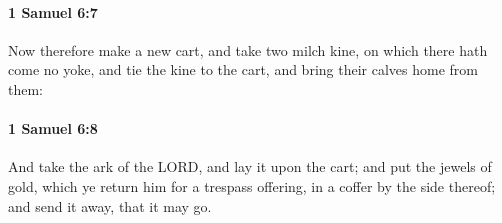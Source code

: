 		\paragraph{1 Samuel 6:7} %
			\label{1SAMUEL-6-7}

			Now therefore make a new cart, and take two milch kine, on which there hath come no yoke, and tie the kine to the cart, and bring their calves home from them:


		\paragraph{1 Samuel 6:8} %
			\label{1SAMUEL-6-8}

			And take the ark of the LORD, and lay it upon the cart; and put the jewels of gold, which ye return him for a trespass offering, in a coffer by the side thereof; and send it away, that it may go.


